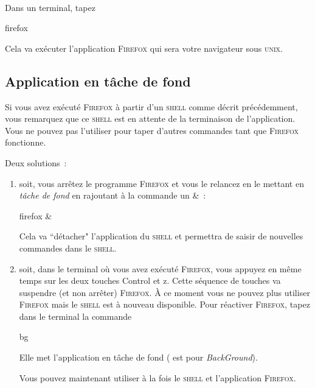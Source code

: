 \documentclass[a4paper,11pt]{article}
\newcommand{\netscape}{\textsc{Firefox}\xspace}
\newcommand{\unix}{\textsc{unix}\xspace}
\newcommand{\shell}{\textsc{shell}\xspace}
\begin{document}
\

Dans un terminal, tapez
\begin{commandes}
firefox
\end{commandes}

Cela va exécuter l'application \netscape qui sera votre navigateur
sous \unix.


% 
% 
% 
% 
\subsection{Application en tâche de fond}

Si vous avez exécuté \netscape à partir d'un \shell comme décrit précédemment,
vous remarquez que ce \shell est en attente de la terminaison de
l'application. Vous ne pouvez pas l'utiliser pour taper d'autres commandes
tant que \netscape fonctionne.

Deux solutions~:

\begin{enumerate}
  \item soit, vous arrêtez le programme \netscape et vous le relancez en le
        mettant en \textit{tâche de fond} en rajoutant à la commande un \&~:
        \begin{commandes}
          firefox \&
        \end{commandes}
        Cela va ``détacher" l'application du \shell et permettra de saisir de
        nouvelles commandes dans le \shell.
  \item soit, dans le terminal où vous avez exécuté \netscape, vous appuyez en
        même temps sur les deux touches Control et z. Cette séquence de
        touches va suspendre (et non arrêter) \netscape. À ce moment vous ne
        pouvez plus utiliser \netscape mais le \shell est à nouveau
        disponible. Pour réactiver \netscape, tapez dans le terminal la
        commande
        \begin{commandes}
          bg
        \end{commandes}
        Elle met l'application en tâche de fond ( est pour
        \emph{BackGround}).

        Vous pouvez maintenant utiliser à la fois le \shell et l'application
        \netscape.
\end{enumerate}
\end{document}
